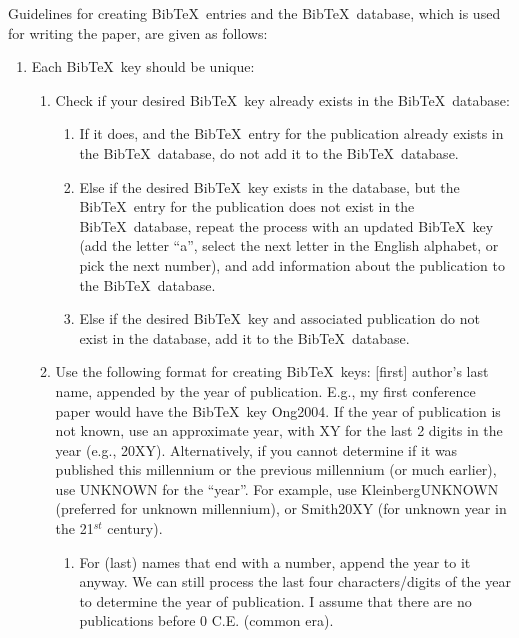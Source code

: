 \documentclass[letter,12pt]{article}
\begin{document}
Guidelines for creating {\sc Bib}\TeX\ entries and the {\sc Bib}\TeX\ database, which is used for writing the paper, are given as follows: \vspace{-0.2cm}
\begin{enumerate} \itemsep -2pt
\item Each {\sc Bib}\TeX\ key should be unique: \vspace{-0.3cm}
	\begin{enumerate} \itemsep -2pt
	\item Check if your desired {\sc Bib}\TeX\ key already exists in the {\sc Bib}\TeX\ database: \vspace{-0.1cm}
		\begin{enumerate} %
		\item If it does, and the {\sc Bib}\TeX\ entry for the publication already exists in the {\sc Bib}\TeX\ database, do not add it to the  {\sc Bib}\TeX\ database.
		\item Else if the desired {\sc Bib}\TeX\ key exists in the database, but the {\sc Bib}\TeX\ entry for the publication does not exist in the {\sc Bib}\TeX\ database, repeat the process with an updated {\sc Bib}\TeX\ key (add the letter ``a'', select the next letter in the English alphabet, or pick the next number), and add information about the publication to the  {\sc Bib}\TeX\ database.
		\item Else if the desired {\sc Bib}\TeX\ key and associated publication do not exist in the database, add it to the  {\sc Bib}\TeX\ database.
		\end{enumerate}
	\item Use the following format for creating {\sc Bib}\TeX\ keys: [first] author's last name, appended by the year of publication. E.g., my first conference paper would have the {\sc Bib}\TeX\ key Ong2004. If the year of publication is not known, use an approximate year, with XY for the last 2 digits in the year (e.g., 20XY). Alternatively, if you cannot determine if it was published this millennium or the previous millennium (or much earlier), use UNKNOWN for the ``year''. For example, use KleinbergUNKNOWN (preferred for unknown millennium), or Smith20XY (for unknown year in the 21$^{st}$ century). \vspace{-0.2cm}
		\begin{enumerate} \itemsep -2pt
		\item For (last) names that end with a number, append the year to it anyway. We can still process the last four characters/digits of the year to determine the year of publication. I assume that there are no publications before 0 C.E. (common era).

\end{enumerate}
\end{enumerate}
\end{enumerate}
\end{document}
